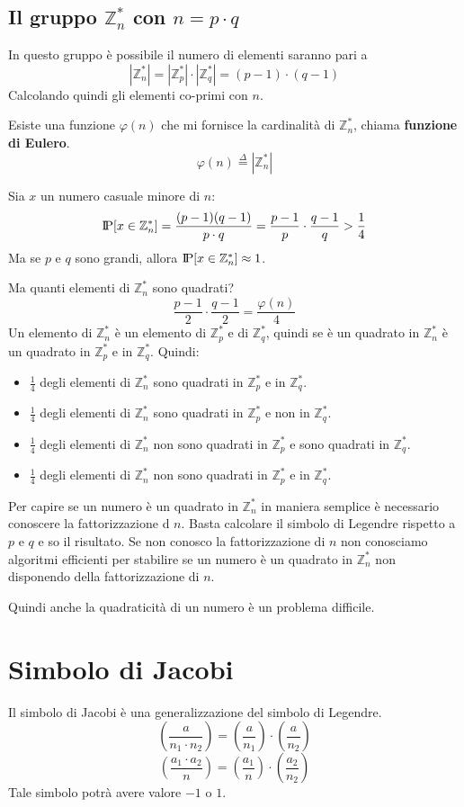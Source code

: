 \subsection{Il gruppo $\mathbb{Z}_n^*$ con $n = p \cdot q$}
In questo gruppo è possibile il numero di elementi saranno pari a
\[
  |\mathbb{Z}_n^*| = |\mathbb{Z}_p^*| \cdot |\mathbb{Z}_q^*| = 
  (p-1) \cdot (q-1)
\]
Calcolando quindi gli elementi co-primi con $n$.

Esiste una funzione $\varphi(n)$ che mi fornisce la cardinalità di 
$\mathbb{Z}_n^*$, chiama \textbf{funzione di Eulero}.
\[
  \varphi(n) \stackrel{\Delta}{=} |\mathbb{Z}_n^*|
\]

Sia $x$ un numero casuale minore di $n$:
\[
  \text{I\kern-0.15em P}[x \in \mathbb{Z}_n^*] = \frac{(p-1)(q-1)}{p\cdot q} =
  \frac{p-1}{p} \cdot \frac{q-1}{q} > \frac{1}{4}
\]
Ma se $p$ e $q$ sono grandi, allora $\text{I\kern-0.15em P}[x \in \mathbb{Z}_n^*] \approx 1$.

Ma quanti elementi di $\mathbb{Z}_n^*$ sono quadrati?
\[
  \frac{p - 1}{2} \cdot \frac{q - 1}{2} = \frac{\varphi(n)}{4}
\]
Un elemento di $\mathbb{Z}_n^*$ è un elemento di $\mathbb{Z}_p^*$ e 
di $\mathbb{Z}_q^*$, quindi se è un quadrato in $\mathbb{Z}_n^*$ è un
quadrato in $\mathbb{Z}_p^*$ e in $\mathbb{Z}_q^*$.
Quindi:
\begin{itemize}
  \item $\frac{1}{4}$ degli elementi di $\mathbb{Z}_n^*$ sono quadrati in 
  $\mathbb{Z}_p^*$ e in $\mathbb{Z}_q^*$.
  \item $\frac{1}{4}$ degli elementi di $\mathbb{Z}_n^*$ sono quadrati in 
  $\mathbb{Z}_p^*$ e non in $\mathbb{Z}_q^*$.
  \item $\frac{1}{4}$ degli elementi di $\mathbb{Z}_n^*$ non sono quadrati in
  $\mathbb{Z}_p^*$ e sono quadrati in $\mathbb{Z}_q^*$.
  \item $\frac{1}{4}$ degli elementi di $\mathbb{Z}_n^*$ non sono quadrati in
  $\mathbb{Z}_p^*$ e in $\mathbb{Z}_q^*$.
\end{itemize}
Per capire se un numero è un quadrato in $\mathbb{Z}_n^*$  in 
maniera semplice è necessario conoscere la fattorizzazione d $n$.
Basta calcolare il simbolo di Legendre rispetto a $p$ e $q$ e so il
risultato. Se non conosco la fattorizzazione di $n$ non conosciamo 
algoritmi efficienti per stabilire se un numero è un quadrato in
$\mathbb{Z}_n^*$ non disponendo della fattorizzazione di $n$.

Quindi anche la quadraticità di un numero è un problema difficile.

\section{Simbolo di Jacobi}
Il simbolo di Jacobi è una generalizzazione del simbolo di Legendre.
\[
    \left(\frac{a}{n_1 \cdot n_2}\right) = 
    \left(\frac{a}{n_1}\right) \cdot \left(\frac{a}{n_2}\right)
  \]
  \[
    \left(\frac{a_1 \cdot a_2}{n}\right) = 
    \left(\frac{a_1}{n}\right) \cdot \left(\frac{a_2}{n_2}\right)
  \]
  Tale simbolo potrà avere valore $-1$ o $1$.


